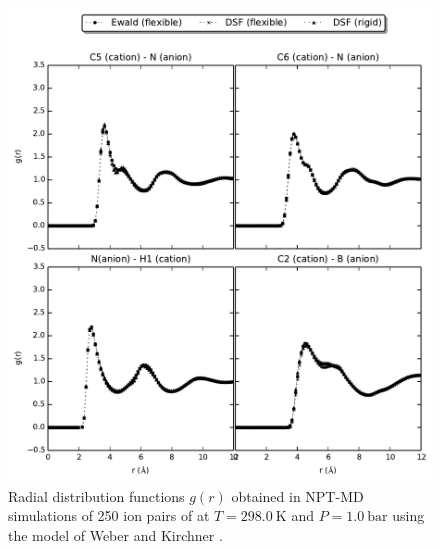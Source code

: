 \documentclass[3p,onecolumn]{elsarticle}
\begin{document}
\begin{figure}[ht]
\includegraphics[]{rdf-Weber}
\caption{Radial distribution functions $g(r)$ obtained in NPT-MD simulations of 250 ion pairs of \ce{[emim][B(CN)4]} at $T = 298.0~\mathrm{K}$ and $P = 1.0~\mathrm{bar}$ using the model of Weber and Kirchner \cite{Weber_2016}.}
\label{fig:rdf-Weber}
\end{figure}
\end{document}
